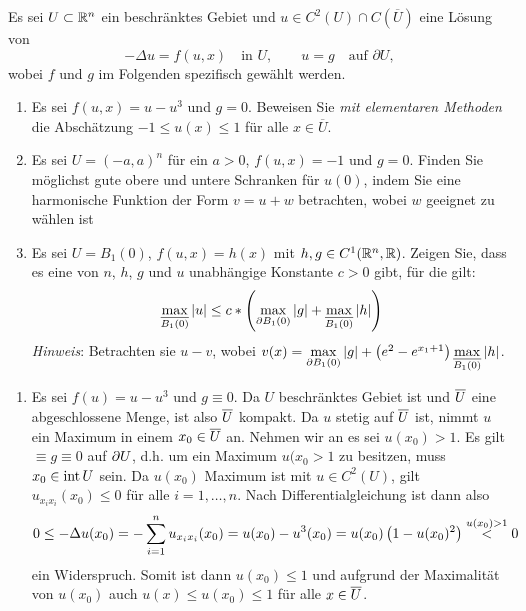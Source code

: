 \begin{exercisePage}
	\begin{task}
		Es sei $U \subset \mathbb{R}^n$ ein beschränktes Gebiet und $u \in C^2(U)\cap C(\overline U)$ eine Lösung von
		$$-\Delta u = f(u,x)\quad\text{in }U,\qquad u = g \quad\text{auf }\partial U,$$
		wobei $f$ und $g$ im Folgenden spezifisch gewählt werden.
		\begin{enumerate}
			\item Es sei $f(u,x) = u-u^3$ und $g=0$. Beweisen Sie \emph{mit elementaren Methoden} die Abschätzung $-1\leq u(x)\leq 1$ für alle $x\in \overline{U}$.
			
			\item Es sei $U = (-a,a)^n$ für ein $a>0$, $f(u,x) = -1$ und $g=0$. Finden Sie möglichst gute obere und untere Schranken für $u(0)$, indem Sie eine harmonische Funktion der Form $v=u+w$ betrachten, wobei $w$ geeignet zu wählen ist
			
			\item Es sei $U = B_1(0)$, $f(u,x) = h(x)$ mit $h,g \in C^1(\mathbb{R}^n,\mathbb{R})$. Zeigen Sie, dass es eine von $n$, $h$, $g$ und $u$ unabhängige Konstante $c>0$ gibt, für die gilt:
			\begin{equation*}
				\max_{\overline{B_1(0)}} |u| \leq c * \left( \max_{\partial B_1(0)} |g| +\max_{\overline{B_1(0)}} |h| \right)
			\end{equation*}		
			\emph{Hinweis}: Betrachten sie $u-v$, wobei
			$v(x)=\max\limits_{\partial B_1(0)} |g| + \left(e^2 - e^{x_1+1} \right) \max\limits_{\overline{B_1(0)}} |h|$.
		\end{enumerate}
	\end{task}

	\begin{enumerate}[label=(zu \alph*), leftmargin=*]
		\item Es sei $f(u) = u - u^3$ und $g \equiv 0$. Da $U$ beschränktes Gebiet ist und $\overline{U}$ eine abgeschlossene Menge, ist also $\overline{U}$ kompakt. Da $u$ stetig auf $\overline{U}$ ist, nimmt $u$ ein Maximum in einem $x_0 \in \overline{U}$ an. Nehmen wir an es sei $u(x_0) > 1$. Es gilt $ \equiv g \equiv 0$ auf $\partial U$, d.h. um ein Maximum $u(x_0 > 1$ zu besitzen, muss $x_0 \in \operatorname{int} U$ sein. Da $u(x_0)$ Maximum ist mit $u \in C^2(U)$, gilt $u_{x_i x_i}(x_0) \le 0$ für alle $i=1, \dots, n$. Nach Differentialgleichung ist dann also
		\begin{equation*}
			0 \le - \Delta u(x_0) =  - \sum_{i=1}^n u_{x_i x_i} (x_0) = u(x_0) - u^3(x_0) = u(x_0) \left( 1 - u(x_0)^2 \right) \overset{u(x_0) > 1}{<} 0
		\end{equation*}
		ein Widerspruch. Somit ist dann $u(x_0) \le 1$ und aufgrund der Maximalität von $u(x_0)$ auch $u(x) \le u(x_0) \le 1$ für alle $x \in \overline{U}$.
		

\end{enumerate}
\end{exercisePage}
